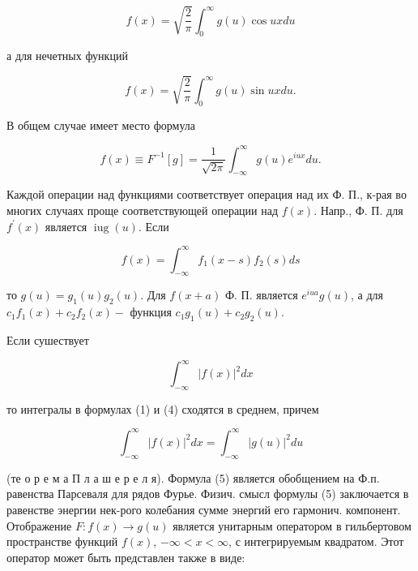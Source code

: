 \documentclass[10pt]{article}
\begin{document}
\[

f(x)=\sqrt{\frac{2}{\pi}} \int_{0}^{\infty} g(u) \cos u x d u

\]



а для нечетных функций



\[

f(x)=\sqrt{\frac{2}{\pi}} \int_{0}^{\infty} g(u) \sin u x d u .

\]



В общем случае имеет место формула



\[

f(x) \equiv F^{-1}[g]=\frac{1}{\sqrt{2 \pi}} \int_{-\infty}^{\infty} g(u) e^{i u x} d u .

\]



Каждой операции над функциями соответствует операция над их Ф. П., к-рая во многих случаях проще соответствующей операции над $f(x)$. Напр., Ф. П. для $f^{\prime}(x)$ является $\operatorname{iug}(u)$. Если



\[

f(x)=\int_{-\infty}^{\infty} f_{1}(x-s) f_{2}(s) d s

\]



то $g(u)=g_{1}(u) g_{2}(u)$. Для $f(x+a)$ Ф. П. является $e^{i u a} g(u)$, а для $c_{1} f_{1}(x)+c_{2} f_{2}(x)-$ функция $c_{1} g_{1}(u)+c_{2} g_{2}(u)$.



Если сушествует



\[

\int_{-\infty}^{\infty}|f(x)|^{2} d x

\]



то интегралы в формулах (1) и (4) сходятся в среднем, причем



\[

\int_{-\infty}^{\infty}|f(x)|^{2} d x=\int_{-\infty}^{\infty}|g(u)|^{2} d u

\]



(те о р е м а П л а ш е р е л я). Формула (5) является обобщением на Ф.п. равенства Парсеваля для рядов Фурье. Физич. смысл формулы (5) заключается в равенстве энергии нек-рого колебания сумме энергий его гармонич. компонент. Отображение $F: f(x) \rightarrow g(u)$ является унитарным оператором в гильбертовом пространстве функций $f(x)$, $-\infty<x<\infty$, с интегрируемым квадратом. Этот оператор может быть представлен также в виде:
\end{document}
